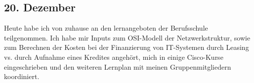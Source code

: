 \subsection{20. Dezember}
Heute habe ich von zuhause an den lernangeboten der Berufsschule teilgenommen. Ich habe mir Inputs zum OSI-Modell der Netzwerkstruktur, sowie zum Berechnen der Kosten bei der Finanzierung von IT-Systemen durch Leasing vs. durch Aufnahme eines Kredites angehört, mich in einige Cisco-Kurse eingeschrieben und den weiteren Lernplan mit meinen Gruppenmitgliedern koordiniert.